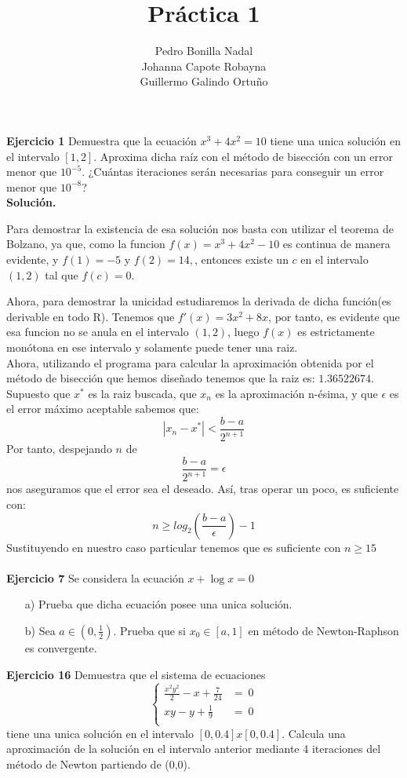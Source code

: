 \documentclass[11pt]{article}
\title{\textbf{Práctica 1}}
\author{Pedro Bonilla Nadal\\
		Johanna Capote Robayna\\
		Guillermo Galindo Ortuño}
\date{}
\begin{document}
\maketitle

\textbf{Ejercicio 1}
Demuestra que la ecuaci\'on $ x^3 + 4x^2 = 10 $ tiene una unica soluci\'on en el intervalo $ [1,2] $. Aproxima dicha ra\'iz con el m\'etodo de bisecci\'on con un error menor que $10^{-5}$. ¿Cu\'antas iteraciones ser\'an necesarias para conseguir un error menor que $10^{-8}$?
\\

\textbf{Solución.}

Para demostrar la existencia de esa solución nos basta con utilizar el teorema de Bolzano, ya que, como la funcion $f(x)=x^3 +4x^2 -10$ es continua de manera evidente, y $f(1) = -5$ y $f(2) =  14,$, entonces existe un $c$ en el intervalo $(1,2)$ tal que $f(c) = 0$.

Ahora, para demostrar la unicidad estudiaremos la derivada de dicha función(es derivable en todo 
 R). Tenemos que $f'(x) = 3x^2 +8x$, por tanto, es evidente que esa funcion no se anula en el intervalo $(1,2)$, luego $f(x)$ es estrictamente monótona en ese intervalo y solamente puede tener una raiz.
\\

Ahora, utilizando el programa para calcular la aproximación obtenida por el método de bisección que hemos diseñado tenemos que la raiz es: $1.36522674$.
\\

Supuesto que $x^*$ es la raiz buscada, que $x_n$ es la aproximación n-ésima, y que $\epsilon$ es el error máximo aceptable sabemos que:
$$|x_n - x^*| < \frac{b-a}{2^{n+1}}$$
Por tanto, despejando $n$ de 
$$\frac{b-a}{2^{n+1}} = \epsilon$$
nos aseguramos que el error sea el deseado. Así, tras operar un poco, es suficiente con:
$$ n \geq log_2(\frac{b-a}{\epsilon})-1$$
Sustituyendo en nuestro caso particular tenemos que es suficiente con $n \geq 15$
\\ \\

\textbf{Ejercicio 7}
Se considera la ecuaci\'on $x + \log x = 0$
\begin{itemize}

\item[a)]Prueba que dicha ecuaci\'on posee una unica soluci\'on.
\item[b)] Sea $a \in (0, \frac{1}{2})$. Prueba que  si $x_0 \in [a,1]$ en m\'etodo de Newton-Raphson es convergente.

\end{itemize}
\textbf{Ejercicio 16}
Demuestra que el sistema de ecuaciones
$$\begin{cases}
\frac{x^2y^2}{2} - x + \frac{7}{24} &= \ 0 \\
xy - y + \frac{1}{9} &= \ 0\\
\end{cases}$$
tiene una unica soluci\'on en el intervalo $[0, 0.4]x[0, 0.4]$. Calcula una aproximaci\'on de la soluci\'on en el intervalo anterior mediante 4 iteraciones del m\'etodo de Newton partiendo de (0,0).
\end{document}

